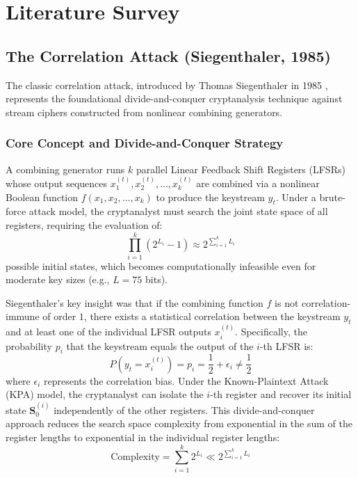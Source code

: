 \chapter{Literature Survey}
\label{ch:literature_survey}

\section{The Correlation Attack (Siegenthaler, 1985)}
\label{sec:siegenthaler_attack}

The classic correlation attack, introduced by Thomas Siegenthaler in 1985 \cite{siegenthaler1985}, represents the foundational divide-and-conquer cryptanalysis technique against stream ciphers constructed from nonlinear combining generators. 

\subsection{Core Concept and Divide-and-Conquer Strategy}
A combining generator runs $k$ parallel Linear Feedback Shift Registers (LFSRs) whose output sequences $x_1^{(t)}, x_2^{(t)}, \dots, x_k^{(t)}$ are combined via a nonlinear Boolean function $f(x_1, x_2, \dots, x_k)$ to produce the keystream $y_t$. Under a brute-force attack model, the cryptanalyst must search the joint state space of all registers, requiring the evaluation of:
$$\prod_{i=1}^k (2^{L_i} - 1) \approx 2^{\sum_{i=1}^k L_i}$$
possible initial states, which becomes computationally infeasible even for moderate key sizes (e.g., $L = 75$ bits).

Siegenthaler's key insight was that if the combining function $f$ is not correlation-immune of order $1$, there exists a statistical correlation between the keystream $y_t$ and at least one of the individual LFSR outputs $x_i^{(t)}$. Specifically, the probability $p_i$ that the keystream equals the output of the $i$-th LFSR is:
\begin{equation}
P(y_t = x_i^{(t)}) = p_i = \frac{1}{2} + \epsilon_i \neq \frac{1}{2}
\label{eq:correlation_prob}
\end{equation}
where $\epsilon_i$ represents the correlation bias. Under the Known-Plaintext Attack (KPA) model, the cryptanalyst can isolate the $i$-th register and recover its initial state $\mathbf{S}_0^{(i)}$ independently of the other registers. This divide-and-conquer approach reduces the search space complexity from exponential in the sum of the register lengths to exponential in the individual register lengths:
$$\text{Complexity} = \sum_{i=1}^k 2^{L_i} \ll 2^{\sum_{i=1}^k L_i}$$

